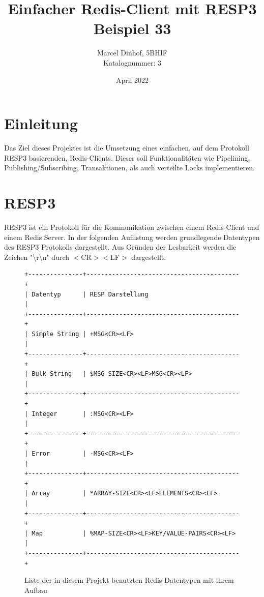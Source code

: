 \documentclass[12pt, letterpaper]{article}
\title{Einfacher Redis-Client mit RESP3\\Beispiel 33}
\author{Marcel Dinhof, 5BHIF\\Katalognummer: 3}
\date{April 2022}
\begin{document}
\begin{titlepage}
\maketitle
\end{titlepage}

\tableofcontents
\newpage

\section{Einleitung}
Das Ziel dieses Projektes ist die Umsetzung eines einfachen, auf dem Protokoll RESP3 basierenden, Redis-Clients. Dieser soll Funktionalitäten wie Pipelining, Publishing/Subscribing, Transaktionen, als auch verteilte Locks implementieren.

\section{RESP3}\label{sec:RESP3}
RESP3 ist ein Protokoll für die Kommunikation zwischen einem Redis-Client und einem Redis Server.
In der folgenden Auflistung werden grundlegende Datentypen des RESP3 Protokolls dargestellt. Aus Gründen der Lesbarkeit werden die Zeichen "{{\textbackslash}r}{{\textbackslash}n}" durch {$<$CR$>$}{$<$LF$>$} dargestellt.

\begin{figure}[h]
\begin{verbatim}
+---------------+------------------------------------------+
| Datentyp      | RESP Darstellung                         | 
+---------------+------------------------------------------+
| Simple String | +MSG<CR><LF>                             | 
+---------------+------------------------------------------+
| Bulk String   | $MSG-SIZE<CR><LF>MSG<CR><LF>             |
+---------------+------------------------------------------+
| Integer       | :MSG<CR><LF>                             |
+---------------+------------------------------------------+
| Error         | -MSG<CR><LF>                             |
+---------------+------------------------------------------+
| Array         | *ARRAY-SIZE<CR><LF>ELEMENTS<CR><LF>      |
+---------------+------------------------------------------+
| Map           | %MAP-SIZE<CR><LF>KEY/VALUE-PAIRS<CR><LF> |
+---------------+------------------------------------------+
\end{verbatim}
\caption{Liste der in diesem Projekt benutzten Redis-Datentypen mit ihrem Aufbau}
\end{figure}
\end{document}
